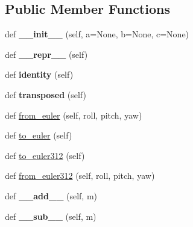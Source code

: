 \subsection*{Public Member Functions}
\begin{DoxyCompactItemize}
\item 
\mbox{\label{classpymavlink_1_1rotmat_1_1Matrix3_abbd2600e17b922e8f1311dfdecd4ad10}} 
def {\bfseries \+\_\+\+\_\+init\+\_\+\+\_\+} (self, a=None, b=None, c=None)
\item 
\mbox{\label{classpymavlink_1_1rotmat_1_1Matrix3_abfd504b096110e23400b43cc19ef53a3}} 
def {\bfseries \+\_\+\+\_\+repr\+\_\+\+\_\+} (self)
\item 
\mbox{\label{classpymavlink_1_1rotmat_1_1Matrix3_a3ec58a383c67373271ee5df401123516}} 
def {\bfseries identity} (self)
\item 
\mbox{\label{classpymavlink_1_1rotmat_1_1Matrix3_a2e4b87e4a5f9ad6c71b44393094e247e}} 
def {\bfseries transposed} (self)
\item 
def \hyperlink{classpymavlink_1_1rotmat_1_1Matrix3_ab56d7d62a2e980b5528cadd6af6f273d}{from\+\_\+euler} (self, roll, pitch, yaw)
\item 
def \hyperlink{classpymavlink_1_1rotmat_1_1Matrix3_a19396c2c390f18faf6701318dba6817a}{to\+\_\+euler} (self)
\item 
def \hyperlink{classpymavlink_1_1rotmat_1_1Matrix3_a2c98ce17c4aea40f8de2ea1716000ea4}{to\+\_\+euler312} (self)
\item 
def \hyperlink{classpymavlink_1_1rotmat_1_1Matrix3_a0b834f239462597a080898e9528839a7}{from\+\_\+euler312} (self, roll, pitch, yaw)
\item 
\mbox{\label{classpymavlink_1_1rotmat_1_1Matrix3_af301b49689faf41d66a509e4cd2bfdbb}} 
def {\bfseries \+\_\+\+\_\+add\+\_\+\+\_\+} (self, m)
\item 
\mbox{\label{classpymavlink_1_1rotmat_1_1Matrix3_aaf33cc183b0470c7fa2e20be34bbf1f9}} 
def {\bfseries \+\_\+\+\_\+sub\+\_\+\+\_\+} (self, m)
\item 
\mbox{\label{classpymavlink_1_1rotmat_1_1Matrix3_a51a04b56f9927d460006b68f5156126c}} 

\end{DoxyCompactItemize}
